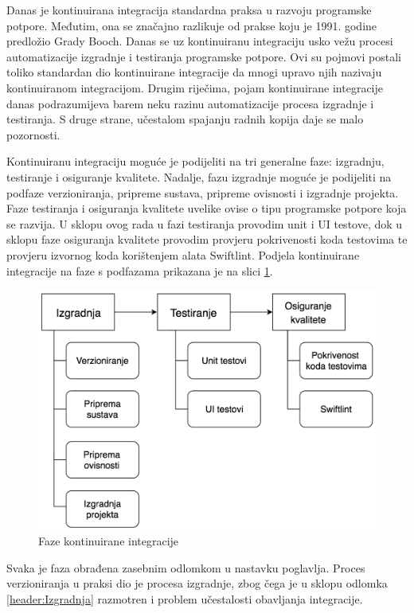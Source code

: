 \documentclass[times, utf8, diplomski, numeric]{fer}
\begin{document}
Danas je kontinuirana integracija standardna praksa u razvoju programske potpore. Međutim, ona se značajno razlikuje od prakse koju je 1991. godine predložio Grady Booch. Danas se uz kontinuiranu integraciju usko vežu procesi automatizacije izgradnje i testiranja programske potpore. Ovi su pojmovi postali toliko standardan dio kontinuirane integracije da mnogi upravo njih nazivaju kontinuiranom integracijom. Drugim riječima, pojam kontinuirane integracije danas podrazumijeva barem neku razinu automatizacije procesa izgradnje i testiranja. S druge strane, učestalom spajanju radnih kopija daje se malo pozornosti.

Kontinuiranu integraciju moguće je podijeliti na tri generalne faze: izgradnju, testiranje i osiguranje kvalitete. Nadalje, fazu izgradnje moguće je podijeliti na podfaze verzioniranja, pripreme sustava, pripreme ovisnosti i izgradnje projekta. Faze testiranja i osiguranja kvalitete uvelike ovise o tipu programske potpore koja se razvija. U sklopu ovog rada u fazi testiranja provodim unit i UI testove, dok u sklopu faze osiguranja kvalitete provodim provjeru pokrivenosti koda testovima te provjeru izvornog koda korištenjem alata Swiftlint. Podjela kontinuirane integracije na faze s podfazama prikazana je na slici \ref{fig:CIFazes}.

\begin{figure}
\centering
\includegraphics[scale=0.6]{CIFazes}
\caption{Faze kontinuirane integracije}
\label{fig:CIFazes}
\end{figure}

Svaka je faza obrađena zasebnim odlomkom u nastavku poglavlja. Proces verzioniranja u praksi dio je procesa izgradnje, zbog čega je u sklopu odlomka \ref{header:Izgradnja} razmotren i problem učestalosti obavljanja integracije.
\end{document}

